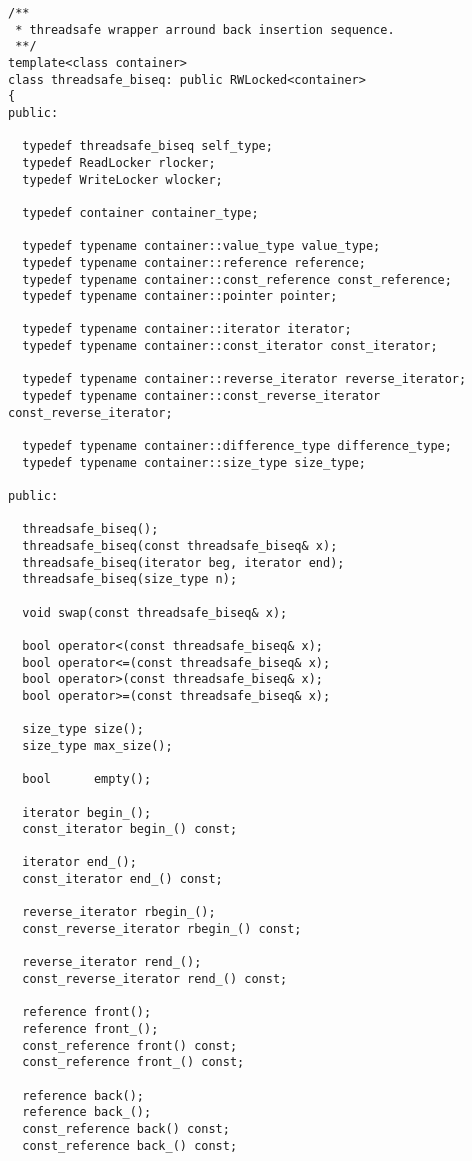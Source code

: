 \documentclass[10pt]{article}
\begin{document}
\begin{verbatim}
/**
 * threadsafe wrapper arround back insertion sequence.
 **/
template<class container>
class threadsafe_biseq: public RWLocked<container>
{
public:

  typedef threadsafe_biseq self_type;
  typedef ReadLocker rlocker;
  typedef WriteLocker wlocker;
  
  typedef container container_type;

  typedef typename container::value_type value_type;
  typedef typename container::reference reference;
  typedef typename container::const_reference const_reference;
  typedef typename container::pointer pointer;

  typedef typename container::iterator iterator;
  typedef typename container::const_iterator const_iterator;

  typedef typename container::reverse_iterator reverse_iterator;
  typedef typename container::const_reverse_iterator const_reverse_iterator;

  typedef typename container::difference_type difference_type;
  typedef typename container::size_type size_type;

public:

  threadsafe_biseq();
  threadsafe_biseq(const threadsafe_biseq& x);
  threadsafe_biseq(iterator beg, iterator end);
  threadsafe_biseq(size_type n);

  void swap(const threadsafe_biseq& x);

  bool operator<(const threadsafe_biseq& x);
  bool operator<=(const threadsafe_biseq& x);
  bool operator>(const threadsafe_biseq& x);
  bool operator>=(const threadsafe_biseq& x);

  size_type size();
  size_type max_size();

  bool      empty();

  iterator begin_();
  const_iterator begin_() const;

  iterator end_();
  const_iterator end_() const;

  reverse_iterator rbegin_();
  const_reverse_iterator rbegin_() const;

  reverse_iterator rend_();
  const_reverse_iterator rend_() const;

  reference front();
  reference front_();
  const_reference front() const;
  const_reference front_() const;

  reference back();
  reference back_();
  const_reference back() const;
  const_reference back_() const;


\end{verbatim}
\end{document}
